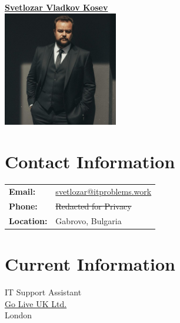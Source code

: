 \documentclass[letterpaper, 10pt]{article}
\newcommand{\redact}[1]{\textcolor{black!40}{#1}}
\begin{document}
	\pagestyle{empty} %
	
	\begin{center}
		\begin{minipage}[t]{0.5\textwidth}
			\centering
			\Large\textbf{\href{https://www.linkedin.com/in/svetlozar-kosev-m-sc-it-278058144/}{Svetlozar
					Vladkov Kosev}}\\[2ex]
			\includegraphics[width=5cm, height=5cm, keepaspectratio]{photo.jpg}
		\end{minipage}%
		\begin{minipage}[t]{0.5\textwidth}
			\section*{Contact Information}
			\begin{tabular}{@{}l l}
				\textbf{Email:}   & \href{mailto:svetlozar@itproblems.work}{svetlozar@itproblems.work} \\
				\textbf{Phone:} & \redact{\st{Redacted for Privacy}} \\
				\textbf{Location:} & Gabrovo, Bulgaria                                                  \\
			\end{tabular}
			
			\section*{Current Information}
			IT Support Assistant \\ \href{https://www.goliveuk.com/}{Go Live UK Ltd.}
			\\ London \\
		\end{minipage}
	\end{center}
	
\end{document}
